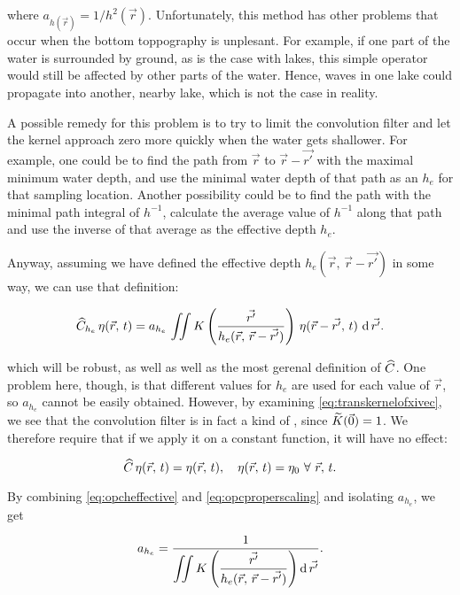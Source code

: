 where $a_{h(\vec{r})} = 1/h^2(\vec{r})$. Unfortunately, this method has other problems that occur when the bottom toppography is unplesant. For example, if one part of the water is surrounded by ground, as is the case with lakes, this simple operator would still be affected by other parts of the water. Hence, waves in one lake could propagate into another, nearby lake, which is not the case in reality.

A possible remedy for this problem is to try to limit the convolution filter and let the kernel approach zero more quickly when the water gets shallower. For example, one could be to find the path from $\vec{r}$ to $\vec{r}-\vec{r'}$ with the maximal minimum water depth, and use the minimal water depth of that path as an  $h_e$ for that sampling location. Another possibility could be to find the path with the minimal path integral of $h^{-1}$, calculate the average value of $h^{-1}$ along that path and use the inverse of that average as the effective depth $h_e$.

Anyway, assuming we have defined the effective depth \mbox{$h_e(\vec{r},\,\vec{r}-\vec{r'})$} in some way, we can use that definition:

\begin{equation} \label{eq:opcheffective}
\widehat{C}_{h_e}\,\eta(\vec{r},\,t) = a_{h_e}\,\iint K\left(\frac{\vec{r'}}{h_e(\vec{r},\,\vec{r}-\vec{r'})}\right)\,\eta(\vec{r}-\vec{r'},\,t)\,\operatorname{d}\vec{r'}.
\end{equation}

which will be robust, as well as well as the most gerenal definition of $\widehat{C}$. One problem here, though, is that different values for $h_e$ are used for each value of $\vec{r}$, so $a_{h_e}$ cannot be easily obtained. However, by examining \eqref{eq:transkernelofxivec}, we see that the convolution filter is in fact a kind of , since $\widetilde{K}(\vec{0}) = 1$. We therefore require that if we apply it on a constant function, it will have no effect:

\begin{equation} \label{eq:opcproperscaling}
\widehat{C}\,\eta(\vec{r},\,t) = \eta(\vec{r},\,t),\quad\eta(\vec{r},\,t) = \eta_0\ \forall\ \vec{r},\,t.
\end{equation}

By combining \eqref{eq:opcheffective} and \eqref{eq:opcproperscaling} and isolating $a_{h_e}$, we get

\begin{equation} \label{eq:scalingheffective}
a_{h_e} = \frac{1}{\displaystyle\iint K\left(\frac{\vec{r'}}{h_e(\vec{r},\,\vec{r}-\vec{r'})}\right) \operatorname{d}\vec{r'}}.
\end{equation}

